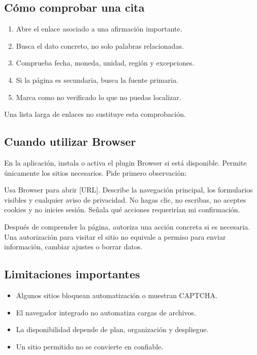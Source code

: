 \documentclass[10pt,a4paper,openany]{book}
\providecommand{\tightlist}{\setlength{\itemsep}{0.18em}\setlength{\parskip}{0pt}}
\newenvironment{Shaded}{}{}
\newcommand{\NormalTok}[1]{#1}
\renewenvironment{Shaded}
  {\begin{tcolorbox}[
    enhanced,
    breakable,
    colback=CodeBg,
    colframe=Border,
    boxrule=0.5pt,
    arc=2mm,
    left=3mm,
    right=3mm,
    top=2.2mm,
    bottom=2.2mm,
    before skip=0.8em,
    after skip=0.9em
  ]}
  {\end{tcolorbox}}
\begin{document}
\subsection{Cómo comprobar una cita}\label{cuxf3mo-comprobar-una-cita}

\begin{enumerate}
\def\labelenumi{\arabic{enumi}.}
\tightlist
\item
  Abre el enlace asociado a una afirmación importante.
\item
  Busca el dato concreto, no solo palabras relacionadas.
\item
  Comprueba fecha, moneda, unidad, región y excepciones.
\item
  Si la página es secundaria, busca la fuente primaria.
\item
  Marca como no verificado lo que no puedas localizar.
\end{enumerate}

Una lista larga de enlaces no sustituye esta comprobación.

\subsection{Cuando utilizar Browser}\label{cuando-utilizar-browser}

En la aplicación, instala o activa el plugin Browser si está disponible.
Permite únicamente los sitios necesarios. Pide primero observación:

\begin{Shaded}
\begin{Highlighting}[]
\NormalTok{Usa Browser para abrir [URL]. Describe la navegación principal, los formularios}
\NormalTok{visibles y cualquier aviso de privacidad. No hagas clic, no escribas, no aceptes}
\NormalTok{cookies y no inicies sesión. Señala qué acciones requerirían mi confirmación.}
\end{Highlighting}
\end{Shaded}

Después de comprender la página, autoriza una acción concreta si es
necesaria. Una autorización para visitar el sitio no equivale a permiso
para enviar información, cambiar ajustes o borrar datos.

\subsection{Limitaciones importantes}\label{limitaciones-importantes}

\begin{itemize}
\tightlist
\item
  Algunos sitios bloquean automatización o muestran CAPTCHA.
\item
  El navegador integrado no automatiza cargas de archivos.
\item
  La disponibilidad depende de plan, organización y despliegue.
\item
  Un sitio permitido no se convierte en confiable.
\end{itemize}
\end{document}
